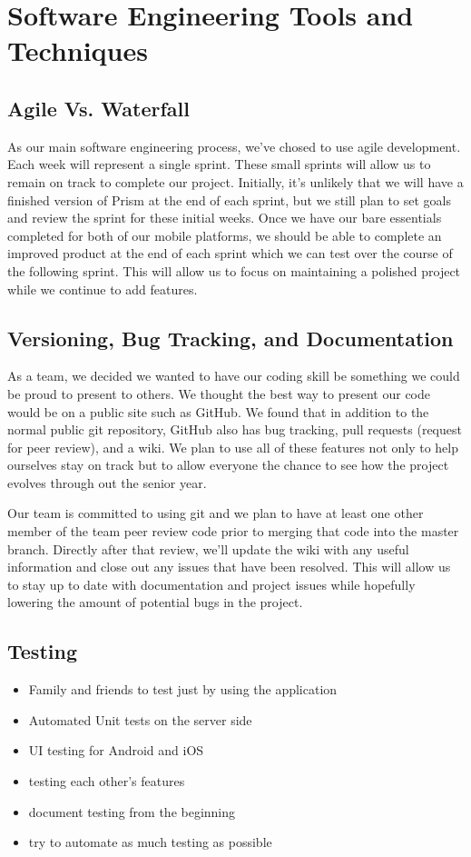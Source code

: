 \documentclass[12pt]{article}
\begin{document}
\section{Software Engineering Tools and Techniques}
\subsection{Agile Vs. Waterfall}
As our main software engineering process, we've chosed to use agile development. Each week will represent a single sprint. These small sprints will allow us to remain on track to complete our project. Initially, it's unlikely that we will have a finished version of Prism at the end of each sprint, but we still plan to set goals and review the sprint for these initial weeks. Once we have our bare essentials completed for both of our mobile platforms, we should be able to complete an improved product at the end of each sprint which we can test over the course of the following sprint. This will allow us to focus on maintaining a polished project while we continue to add features.
\subsection{Versioning, Bug Tracking, and Documentation}
As a team, we decided we wanted to have our coding skill be something we could be proud to present to others.  We thought the best way to present our code would be on a public site such as GitHub.  We found that in addition to the normal public git repository, GitHub also has bug tracking, pull requests (request for peer review), and a wiki.  We plan to use all of these features not only to help ourselves stay on track but to allow everyone the chance to see how the project evolves through out the senior year.  

Our team is committed to using git and we plan to have at least one other member of the team peer review code prior to merging that code into the master branch.  Directly after that review, we’ll update the wiki with any useful information and close out any issues that have been resolved.  This will allow us to stay up to date with documentation and project issues while hopefully lowering the amount of potential bugs in the project.

\subsection{Testing}
\begin{itemize}
\item Family and friends to test just by using the application
\item Automated Unit tests on the server side
\item UI testing for Android and iOS
\item testing each other's features
\item document testing from the beginning
\item try to automate as much testing as possible
\end{itemize}
\end{document}
